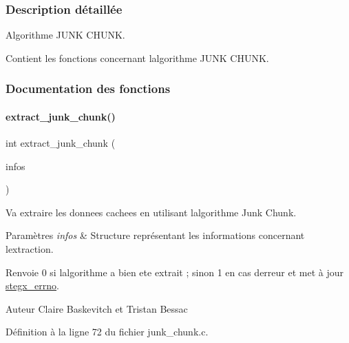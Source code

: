 \subsubsection{Description détaillée}
Algorithme J\+U\+NK C\+H\+U\+NK. 

Contient les fonctions concernant l\textquotesingle{}algorithme J\+U\+NK C\+H\+U\+NK. 

\subsubsection{Documentation des fonctions}
\mbox{\label{a00029_ad04f5216bd1375440a90d0c51a4ba590}} 
\paragraph{\texorpdfstring{extract\+\_\+junk\+\_\+chunk()}{extract\_junk\_chunk()}}
{\footnotesize\ttfamily int extract\+\_\+junk\+\_\+chunk (\begin{DoxyParamCaption}\item[{\hyperlink{a00008_aa8ca908d92fb5bdd3c0a9e1f58b2cf03}{info\+\_\+s} $\ast$}]{infos }\end{DoxyParamCaption})}



Va extraire les donnees cachees en utilisant l\textquotesingle{}algorithme Junk Chunk. 


\begin{DoxyParams}{Paramètres}
{\em infos} & Structure représentant les informations concernant l\textquotesingle{}extraction. \\
\hline
\end{DoxyParams}
\begin{DoxyReturn}{Renvoie}
0 si l\textquotesingle{}algorithme a bien ete extrait ; sinon 1 en cas d\textquotesingle{}erreur et met à jour \hyperlink{a00062_a5ec48ccdfbe19fe23855818f8556abec}{stegx\+\_\+errno}. 
\end{DoxyReturn}
\begin{DoxyAuthor}{Auteur}
Claire Baskevitch et Tristan Bessac 
\end{DoxyAuthor}


Définition à la ligne 72 du fichier junk\+\_\+chunk.\+c.

